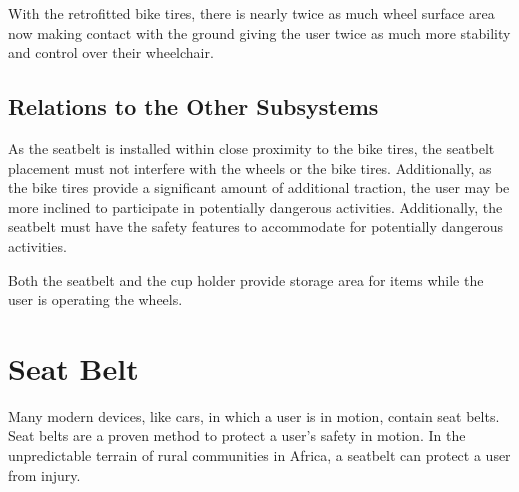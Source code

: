 \documentclass[12pt]{report}
\begin{document}
With the retrofitted bike tires, there is nearly twice as much wheel surface
area now making contact with the ground giving the user twice as much more
stability and control over their wheelchair.

\subsection{Relations to the Other Subsystems}
As the seatbelt is installed within close proximity to the bike tires, the
seatbelt placement must not interfere with the wheels or the bike tires.
Additionally, as the bike tires provide a significant amount of additional
traction, the user may be more inclined to participate in potentially dangerous
activities. Additionally, the seatbelt must have the safety features to
accommodate for potentially dangerous activities.

Both the seatbelt and the cup holder provide storage area for items while the
user is operating the wheels.

%

\section{Seat Belt}
Many modern devices, like cars, in which a user is in motion, contain seat belts.
Seat belts are a proven method to protect a user's safety in
motion\cite{fedorowicz1985seat}. In the
unpredictable terrain of rural communities in Africa, a seatbelt can protect a
user from injury.
\end{document}

